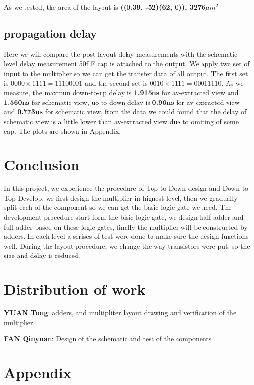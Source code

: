 \documentclass[conference]{IEEEtran}
\begin{document}
As we tested, the area of the layout is \textbf{((0.39, -52)(62, 0)), 3276$\mu m^2$}

\subsection{propagation delay}

Here we will compare the post-layout delay measurements with the schematic level delay measurement 50f F cap is attached to the output. We apply two set of input to the multiplier so we can get the transfer data of all output. The first set is $0000 \times 1111 = 11100001$ and the second set is $0010 \times 1111 = 00011110$. As we measure, the maxmun down-to-up delay is \textbf{1.915ns} for av-extracted view and \textbf{1.560ns} for schematic view, uo-to-down delay is \textbf{0.96ns} for av-extracted view and \textbf{0.773ns} for schematic view, from the data we could found that the delay of schematic view is a little lower than av-extracted view due to omiting of some cap. The plots are shown in Appendix.

\section{Conclusion}

In this project, we experience the procedure of Top to Down design and Down to Top Develop, we first design the multiplier in hignest level, then we gradually split each of the component so we can get the basic logic gate we need. The development procedure start form the bisic logic gate, we design half adder and full adder based on these logic gates, finally the multiplier will be constructed by adders. In each level a serises of test were done to make sure the design functions well. During the layout procedure, we change the way transistors were put, so the size and delay is reduced.

\section*{Distribution of work}

\textbf{YUAN Tong}: adders, and multipliter layout drawing and verification of the multiplier.

\textbf{FAN Qinyuan}: Design of the schematic and test of the components


% 




\newpage
\section{Appendix}
\end{document}
